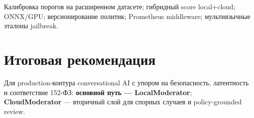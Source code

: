 \documentclass[12pt,a4paper]{report}
\begin{document}
Калибровка порогов на расширенном датасете; гибридный score local+cloud;
ONNX/GPU; версионирование политик; Prometheus middleware; мультиязычные эталоны jailbreak.

\section{Итоговая рекомендация}

Для production-контура conversational AI с упором на безопасность, латентность
и соответствие 152-ФЗ: \textbf{основной путь --- LocalModerator};
\textbf{CloudModerator} --- вторичный слой для спорных случаев и policy-grounded review.
\end{document}
